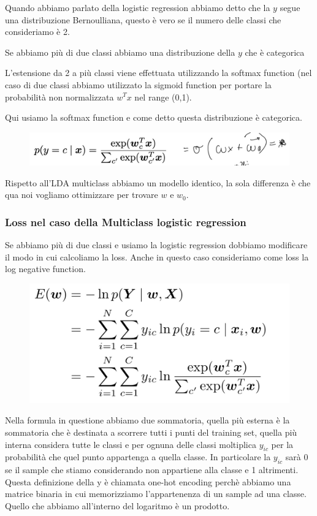 \documentclass[14pt]{extreport}
\begin{document}
Quando abbiamo parlato della logistic regression abbiamo detto che la $y$ segue una distribuzione Bernoulliana, questo è vero se il numero delle
classi che consideriamo è 2.

Se abbiamo più di due classi abbiamo una distribuzione della $y$ che è categorica

L'estensione da 2 a più classi viene effettuata utilizzando la softmax function (nel caso di due classi abbiamo utilizzato la sigmoid function per
portare la probabilità non normalizzata $w^Tx$ nel range (0,1).

Qui usiamo la softmax function e come detto questa distribuzione è categorica.
\begin{figure}[H]
	\centering
	\includegraphics[width=0.6\linewidth]{194.jpeg}
\end{figure}

Rispetto all'LDA multiclass abbiamo un modello identico, la sola differenza è che qua noi vogliamo ottimizzare per trovare $w$ e $w_0$.

\subsubsection{Loss nel caso della Multiclass logistic regression}

Se abbiamo più di due classi e usiamo la logistic regression dobbiamo modificare il modo in cui calcoliamo la loss. Anche in questo caso consideriamo
come loss la log negative function.

\begin{figure}[H]
	\centering
	\includegraphics[width=0.7\linewidth]{195.jpeg}
\end{figure}

Nella formula in questione abbiamo due sommatoria, quella più esterna è la sommatoria che è destinata a scorrere tutti i punti del training set,
quella più interna considera tutte le classi e per ognuna delle classi moltiplica $y_{ic}$ per la probabilità che quel punto appartenga a quella
classe. In particolare la $y_{ic}$ sarà 0 se il sample che stiamo considerando non appartiene alla classe e 1 altrimenti. Questa definizione della y è
chiamata one-hot encoding perchè abbiamo una matrice binaria in cui memorizziamo l'appartenenza di un sample ad una classe. Quello che abbiamo
all'interno del logaritmo è un prodotto.
\end{document}
